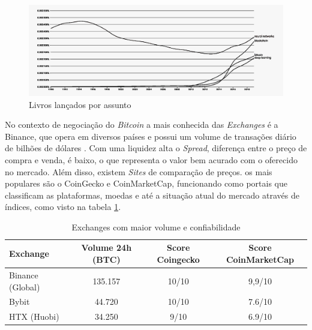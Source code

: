 \begin{figure}[!htb] \centering
    \caption{Livros lançados por assunto} \label{figura:imagengram}
    \begin{varwidth}{\linewidth}
      \includegraphics[width=15cm]{figuras/ngram.png}
    \end{varwidth}
  \end{figure}

No contexto de negociação do \textit{Bitcoin} a mais conhecida das \textit{Exchanges} é a Binance, que opera em diversos países e possui um volume de transações diário de bilhões de dólares \cite{FakeExchanges}.
Com uma liquidez alta o \textit{Spread}, diferença entre o preço de compra e venda, é baixo, o que representa o valor bem acurado com o oferecido no mercado.
Além disso, existem \textit{Sites} de comparação de preços. os mais populares são o CoinGecko e CoinMarketCap, funcionando
como portais que classificam as plataformas, moedas e até a situação atual do mercado através de índices, como visto na tabela \ref{tabela:lista_produtos}.


\begin{table}[!htb]
  \caption{Exchanges com maior volume e confiabilidade} \label{tabela:lista_produtos}
  \begin{tabularx}{\textwidth}{l|c|c|c} \hline
    Exchange      & Volume 24h (BTC) & Score Coingecko & Score CoinMarketCap  \\ \hline
    Binance (Global)      & 135.157      & 10/10        & 9,9/10 \\
    Bybit         & 44.720      & 10/10        & 7.6/10  \\
    HTX (Huobi)       & 34.250     & 9/10        & 6.9/10  \\ \hline
  \end{tabularx}
\end{table}


